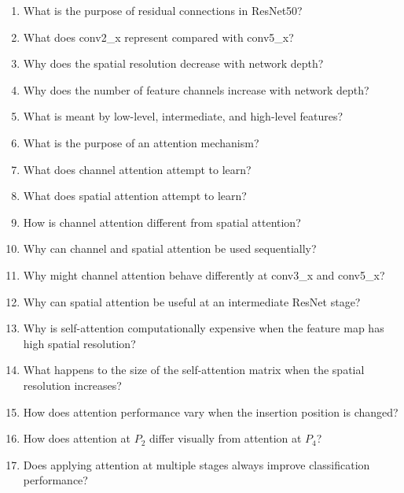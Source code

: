 \documentclass[10pt]{article}
\begin{document}
\begin{enumerate}

\item What is the purpose of residual connections in ResNet50?

\item What does conv2\_x represent compared with conv5\_x?

\item Why does the spatial resolution decrease with network depth?

\item Why does the number of feature channels increase with network depth?

\item What is meant by low-level, intermediate, and high-level features?

\item What is the purpose of an attention mechanism?

\item What does channel attention attempt to learn?

\item What does spatial attention attempt to learn?

\item How is channel attention different from spatial attention?

\item Why can channel and spatial attention be used sequentially?

\item Why might channel attention behave differently at conv3\_x and
conv5\_x?

\item Why can spatial attention be useful at an intermediate ResNet stage?

\item Why is self-attention computationally expensive when the feature map
has high spatial resolution?

\item What happens to the size of the self-attention matrix when the spatial
resolution increases?

\item How does attention performance vary when the insertion position is
changed?

\item How does attention at $P_2$ differ visually from attention at $P_4$?

\item Does applying attention at multiple stages always improve
classification performance?


\end{enumerate}
\end{document}

